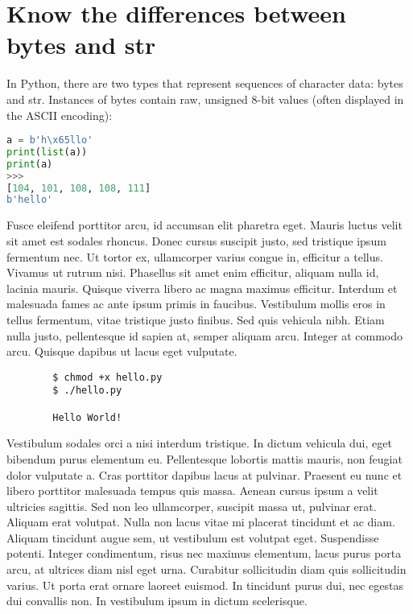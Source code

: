 \documentclass{article}
\begin{document}
\section{Know the differences between bytes and str}

In Python, there are two types that represent sequences of character
data: bytes and str. Instances of bytes contain raw, unsigned 8-bit
values (often displayed in the ASCII encoding):

\begin{file}
\begin{lstlisting}[language=Python]
a = b'h\x65llo'
print(list(a))
print(a)
>>>
[104, 101, 108, 108, 111]
b'hello'
\end{lstlisting}
\end{file}

Fusce eleifend porttitor arcu, id accumsan elit pharetra eget. Mauris luctus velit sit amet est sodales rhoncus. Donec cursus suscipit justo, sed tristique ipsum fermentum nec. Ut tortor ex, ullamcorper varius congue in, efficitur a tellus. Vivamus ut rutrum nisi. Phasellus sit amet enim efficitur, aliquam nulla id, lacinia mauris. Quisque viverra libero ac magna maximus efficitur. Interdum et malesuada fames ac ante ipsum primis in faucibus. Vestibulum mollis eros in tellus fermentum, vitae tristique justo finibus. Sed quis vehicula nibh. Etiam nulla justo, pellentesque id sapien at, semper aliquam arcu. Integer at commodo arcu. Quisque dapibus ut lacus eget vulputate.

\begin{commandline}
	\begin{verbatim}
		$ chmod +x hello.py
		$ ./hello.py

		Hello World!
	\end{verbatim}
\end{commandline}

Vestibulum sodales orci a nisi interdum tristique. In dictum vehicula dui, eget bibendum purus elementum eu. Pellentesque lobortis mattis mauris, non feugiat dolor vulputate a. Cras porttitor dapibus lacus at pulvinar. Praesent eu nunc et libero porttitor malesuada tempus quis massa. Aenean cursus ipsum a velit ultricies sagittis. Sed non leo ullamcorper, suscipit massa ut, pulvinar erat. Aliquam erat volutpat. Nulla non lacus vitae mi placerat tincidunt et ac diam. Aliquam tincidunt augue sem, ut vestibulum est volutpat eget. Suspendisse potenti. Integer condimentum, risus nec maximus elementum, lacus purus porta arcu, at ultrices diam nisl eget urna. Curabitur sollicitudin diam quis sollicitudin varius. Ut porta erat ornare laoreet euismod. In tincidunt purus dui, nec egestas dui convallis non. In vestibulum ipsum in dictum scelerisque.
\end{document}
